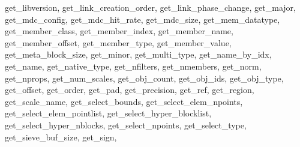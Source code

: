 {{        get_libversion,%
        get_link_creation_order,%
        get_link_phase_change,%
        get_major,%
        get_mdc_config,%
        get_mdc_hit_rate,%
        get_mdc_size,%
        get_mem_datatype,%
        get_member_class,%
        get_member_index,%
        get_member_name,%
        get_member_offset,%
        get_member_type,%
        get_member_value,%
        get_meta_block_size,%
        get_minor,%
        get_multi_type,%
        get_name_by_idx,%
        get_name,%
        get_native_type,%
        get_nfilters,%
        get_nmembers,%
        get_norm,%
        get_nprops,%
        get_num_scales,%
        get_obj_count,%
        get_obj_ids,%
        get_obj_type,%
        get_offset,%
        get_order,%
        get_pad,%
        get_precision,%
        get_ref,%
        get_region,%
        get_scale_name,%
        get_select_bounds,%
        get_select_elem_npoints,%
        get_select_elem_pointlist,%
        get_select_hyper_blocklist,%
        get_select_hyper_nblocks,%
        get_select_npoints,%
        get_select_type,%
        get_sieve_buf_size,%
        get_sign,%
}}
